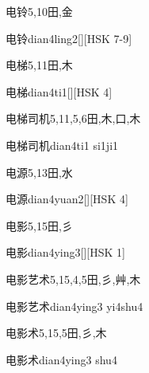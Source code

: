 \begin{Entry}{电铃}{5,10}{⽥,⾦}
  \begin{Phonetics}{电铃}{dian4ling2}[][HSK 7-9]
  \end{Phonetics}
\end{Entry}

\begin{Entry}{电梯}{5,11}{⽥,⽊}
  \begin{Phonetics}{电梯}{dian4ti1}[][HSK 4]
  \end{Phonetics}
\end{Entry}

\begin{Entry}{电梯司机}{5,11,5,6}{⽥,⽊,⼝,⽊}
  \begin{Phonetics}{电梯司机}{dian4ti1 si1ji1}
  \end{Phonetics}
\end{Entry}

\begin{Entry}{电源}{5,13}{⽥,⽔}
  \begin{Phonetics}{电源}{dian4yuan2}[][HSK 4]
  \end{Phonetics}
\end{Entry}

\begin{Entry}{电影}{5,15}{⽥,⼺}
  \begin{Phonetics}{电影}{dian4ying3}[][HSK 1]
  \end{Phonetics}
\end{Entry}

\begin{Entry}{电影艺术}{5,15,4,5}{⽥,⼺,⾋,⽊}
  \begin{Phonetics}{电影艺术}{dian4ying3 yi4shu4}
  \end{Phonetics}
\end{Entry}

\begin{Entry}{电影术}{5,15,5}{⽥,⼺,⽊}
  \begin{Phonetics}{电影术}{dian4ying3 shu4}
  \end{Phonetics}
\end{Entry}

